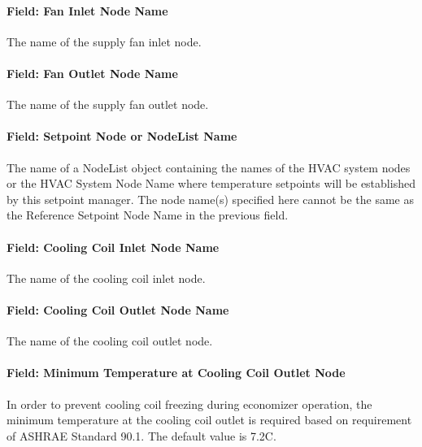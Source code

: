 \paragraph{Field: Fan Inlet Node Name}\label{field-fan-inlet-node-name}

The name of the supply fan inlet node.

\paragraph{Field: Fan Outlet Node Name}\label{field-fan-outlet-node-name-000}

The name of the supply fan outlet node.

\paragraph{Field: Setpoint Node or NodeList Name}\label{field-setpoint-node-or-nodelist-name-8}

The name of a NodeList object containing the names of the HVAC system nodes or the HVAC System Node Name where temperature setpoints will be established by this setpoint manager. The node name(s) specified here cannot be the same as the Reference Setpoint Node Name in the previous field.

\paragraph{Field: Cooling Coil Inlet Node Name}\label{field-cooling-coil-inlet-node-name}

The name of the cooling coil inlet node.

\paragraph{Field: Cooling Coil Outlet Node Name}\label{field-cooling-coil-outlet-node-name}

The name of the cooling coil outlet node.

\paragraph{Field: Minimum Temperature at Cooling Coil Outlet Node}\label{field-minimum-temperature-at-cooling-coil-outlet-node}

In order to prevent cooling coil freezing during economizer operation, the minimum temperature at the cooling coil outlet is required based on requirement of ASHRAE Standard 90.1. The default value is 7.2C.

